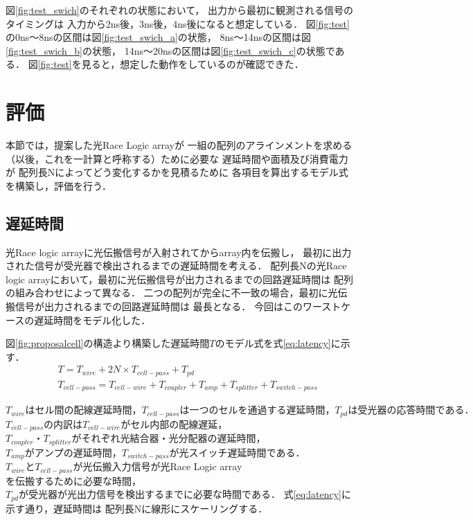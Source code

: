図\ref{fig:test_swich}のそれぞれの状態において，
出力から最初に観測される信号のタイミングは
入力から2ns後，3ns後，4ns後になると想定している．
図\ref{fig:test}の0ns〜8nsの区間は図\ref{fig:test_swich_a}の状態，
8ns〜14nsの区間は図\ref{fig:test_swich_b}の状態，
14ns〜20nsの区間は図\ref{fig:test_swich_c}の状態である．
図\ref{fig:test}を見ると，想定した動作をしているのが確認できた．

\section{評価}
本節では，提案した光Race Logic arrayが
一組の配列のアラインメントを求める（以後，これを一計算と呼称する）ために必要な
遅延時間や面積及び消費電力が
配列長Nによってどう変化するかを見積るために
各項目を算出するモデル式を構築し，評価を行う．

\subsection{遅延時間}
光Race logic arrayに光伝搬信号が入射されてからarray内を伝搬し，
最初に出力された信号が受光器で検出されるまでの遅延時間を考える．
配列長Nの光Race logic arrayにおいて，最初に光伝搬信号が出力されるまでの回路遅延時間は
配列の組み合わせによって異なる．
二つの配列が完全に不一致の場合，最初に光伝搬信号が出力されるまでの回路遅延時間は
最長となる．
今回はこのワーストケースの遅延時間をモデル化した．

図\ref{fig:proposalcell}の構造より構築した遅延時間$T$のモデル式を式\ref{eq:latency}に示す．
\begin{eqnarray}
&&T = T_{wire}+2N \times T_{cell-pass}+T_{pd} \nonumber \\
&&T_{cell-pass} = T_{cell-wire}+T_{coupler}+T_{amp}+T_{splitter}+T_{switch-pass}
\label{eq:latency}
\end{eqnarray}

$T_{wire}はセル間の配線遅延時間，T_{cell-pass}は一つのセルを通過する遅延時間，T_{pd}は受光器の応答時間である．$
$T_{cell-pass}の内訳はT_{cell-wire}がセル内部の配線遅延，$
$T_{coupler}・T_{splitter}がそれぞれ光結合器・光分配器の遅延時間，$
$T_{amp}がアンプの遅延時間，T_{switch-pass}が光スイッチ遅延時間である．$
$T_{wire}とT_{cell-pass}が光伝搬入力信号が$光Race Logic array$を伝搬するために必要な時間，$
$T_{pd}が受光器が光出力信号を検出するまでに必要な時間である．$
式\ref{eq:latency}に示す通り，遅延時間は
配列長Nに線形にスケーリングする．

